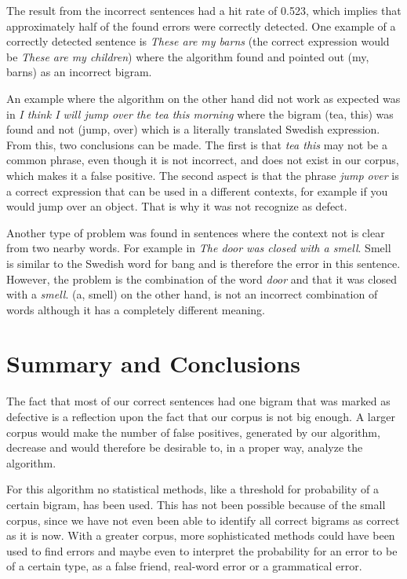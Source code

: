 \documentclass[a4paper,12pt]{article}
\begin{document}
The result from the incorrect sentences had a hit rate of 0.523, which implies that approximately half of the found errors were correctly detected. One example of a correctly detected sentence is \emph{These are my barns} (the correct expression would be \emph{These are my children}) where the algorithm found and pointed out (my, barns) as an incorrect bigram. 

An example where the algorithm on the other hand did not work as expected was in \emph{I think I will jump over the tea this morning} where the bigram (tea, this) was found and not (jump, over) which is a literally translated Swedish expression. From this, two conclusions can be made. The first is that \emph{tea this} may not be a common phrase, even though it is not incorrect, and does not exist in our corpus, which makes it a false positive. The second aspect is that the phrase \emph{jump over} is a correct expression that can be used in a different contexts, for example if you would jump over an object. That is why it was not recognize as defect. 

Another type of problem was found in sentences where the context not is clear from two nearby words. For example in \emph{The door was closed with a smell}. Smell is similar to the Swedish word for bang and is therefore the error in this sentence. However, the problem is the combination of the word \emph{door} and that it was closed with a \emph{smell}. (a, smell) on the other hand, is not an incorrect combination of words although it has a completely different meaning.

\section{Summary and Conclusions}
\label{sec:summary}
The fact that most of our correct sentences had one bigram that was marked as defective is a reflection upon the fact that our corpus is not big enough. A larger corpus would make the number of false positives, generated by our algorithm, decrease and would therefore be desirable to, in a proper way, analyze the algorithm.

For this algorithm no statistical methods, like a threshold for probability of a certain bigram, has been used. This has not been possible because of the small corpus, since we have not even been able to identify all correct bigrams as correct as it is now. With a greater corpus, more sophisticated methods could have been used to find errors and maybe even to interpret the probability for an error to be of a certain type, as a false friend, real-word error or a grammatical error. 
\end{document}
